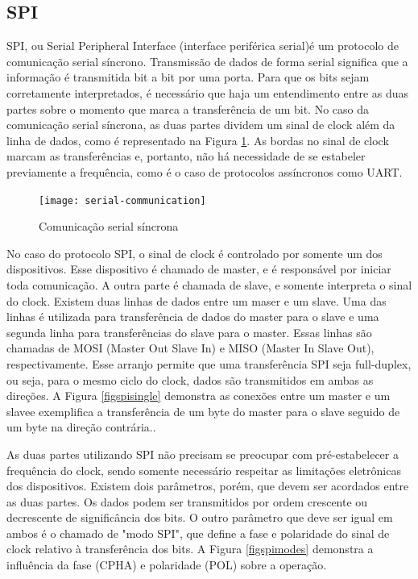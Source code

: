\documentclass[11pt]{article}
\begin{document}
\subsection{SPI}
\tab SPI, ou Serial Peripheral Interface (interface periférica serial)é um protocolo de comunicação serial síncrono. Transmissão de dados de forma serial significa que a informação é transmitida bit a bit por uma porta. Para que os bits sejam corretamente interpretados, é necessário que haja um entendimento entre as duas partes sobre o momento que marca a transferência de um bit. No caso da comunicação serial síncrona, as duas partes dividem um sinal de clock além da linha de dados, como é representado na Figura \ref{figserial}. As bordas no sinal de clock marcam as transferências e, portanto, não há necessidade de se estabeler previamente a frequência, como é o caso de protocolos assíncronos como UART. 
\begin{figure}
    \centering
    \texttt{[image: serial-communication]}
    \caption{Comunicação serial síncrona}
    \label{figserial}
\end{figure}
\par No caso do protocolo SPI, o sinal de clock é controlado por somente um dos dispositivos. Esse dispositivo é chamado de master, e é responsável por iniciar toda comunicação. A outra parte é chamada de slave, e somente interpreta o sinal do clock. Existem duas linhas de dados entre um maser e um slave. Uma das linhas é utilizada para transferência de dados do master para o slave e uma segunda linha para transferências do slave para o master. Essas linhas são chamadas de MOSI (Master Out Slave In) e MISO (Master In Slave Out), respectivamente. Esse arranjo permite que uma transferência SPI seja full-duplex, ou seja, para o mesmo ciclo do clock, dados são transmitidos em ambas as direções. A Figura \ref{figspisingle} demonstra as conexões entre um master e um slavee exemplifica a transferência de um byte do master para o slave seguido de um byte na direção contrária..
\par As duas partes utilizando SPI não precisam se preocupar com pré-estabelecer a frequência do clock, sendo somente necessário respeitar as limitações eletrônicas dos dispositivos. Existem dois parâmetros, porém, que devem ser acordados entre as duas partes. Os dados podem ser transmitidos por ordem crescente ou decrescente de significância dos bits. O outro parâmetro que deve ser igual em ambos é o chamado de "modo SPI", que define a fase e polaridade do sinal de clock relativo à transferência dos bits. A Figura \ref{figspimodes} demonstra a influência da fase (CPHA) e polaridade (POL) sobre a operação.
\end{document}
